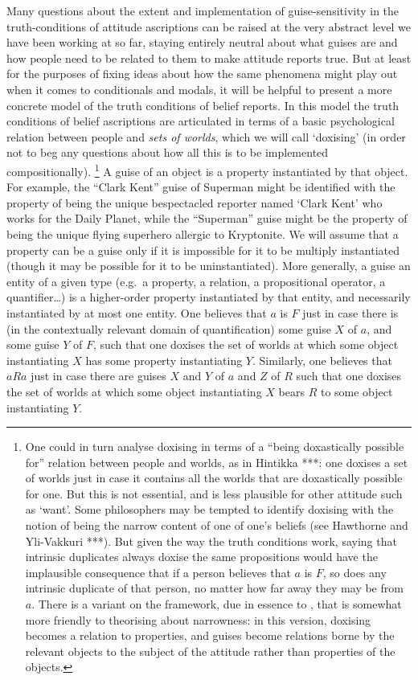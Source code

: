 \documentclass[If.tex]{subfiles}
\begin{document}
Many questions about the extent and implementation of guise-sensitivity in the truth-conditions of attitude ascriptions can be raised at the very abstract level we have been working at so far, staying entirely neutral about what guises are and how people need to be related to them to make attitude reports true.  But at least for the purposes of fixing ideas about how the same phenomena might play out when it comes to conditionals and modals, it will be helpful to present a more concrete model of the truth conditions of belief reports.  In this model the truth conditions of belief ascriptions are articulated in terms of a basic psychological relation between people and \emph{sets of worlds}, which we will call ‘doxising’ (in order not to beg any questions about how all this is to be implemented compositionally).%
\footnote{One could in turn analyse doxising in terms of a “being doxastically possible for” relation between people and worlds, as in Hintikka ***: one doxises a set of worlds just in case it contains all the worlds that are doxastically possible for one.  But this is not essential, and is less plausible for other attitude such as ‘want’.  Some philosophers may be tempted to identify doxising with the notion of being the narrow content of one of one's beliefs (see Hawthorne and Yli-Vakkuri ***).  But given the way the truth conditions work, saying that intrinsic duplicates always doxise the same propositions would have the implausible consequence that if a person believes that $a$ is $F$, so does any intrinsic duplicate of that person, no matter how far away they may be from $a$.  There is a variant on the framework, due in essence to \citet{LewisADDDS}, that is somewhat more friendly to theorising about narrowness: in this version, doxising becomes a relation to properties, and guises become relations borne by the relevant objects to the subject of the attitude rather than properties of the objects.}
A guise of an object is a property instantiated by that object.  For example, the “Clark Kent” guise of Superman might be identified with the property of being the unique bespectacled reporter named ‘Clark Kent’ who works for the Daily Planet, while the “Superman” guise might be the property of being the unique flying superhero allergic to Kryptonite.  We will assume that a property can be a guise only if it is impossible for it to be multiply instantiated (though it may be possible for it to be uninstantiated).  More generally, a guise an entity of a given type (e.g.\ a property, a relation, a propositional operator, a quantifier…) is a higher-order property instantiated by that entity, and necessarily instantiated by at most one entity. One believes that $a$ is $F$ just in case there is (in the contextually relevant domain of quantification) some guise $X$ of $a$, and some guise $Y$ of $F$, such that one doxises the set of worlds at which some object instantiating $X$ has some property instantiating $Y$.  Similarly, one believes that $aRa$ just in case there are guises $X$ and $Y$ of $a$ and $Z$ of $R$ such that one doxises the set of worlds at which some object instantiating $X$ bears $R$ to some object instantiating $Y$.%
\end{document}
